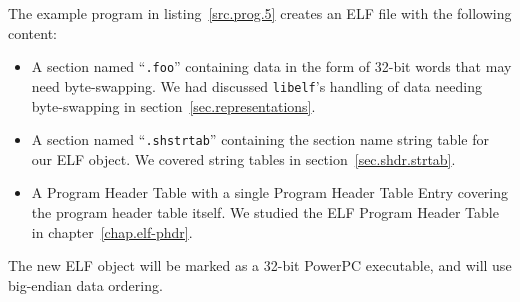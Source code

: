 \documentclass[a4paper,pdftex]{book}
\newcommand{\code}[1]{\texttt{#1}}
\newcommand{\library}[1]{\texttt{#1}}
\newcommand{\trade}{{\small\texttrademark}\xspace}
\newcommand{\elfdatastructure}[1]{\textsf{#1}}
\begin{document}
The example program in listing~\vref{src.prog.5} creates an ELF file
with the following content:

\begin{itemize}
\item A section named ``\code{.foo}'' containing data in the form
  of 32-bit words that may need byte-swapping. We had discussed
  \library{libelf}'s handling of data needing byte-swapping in
  section~\vref{sec.representations}.
\item A section named ``\code{.shstrtab}'' containing the section
  name string table for our ELF object. We covered string tables
  in section~\vref{sec.shdr.strtab}.
\item A \elfdatastructure{Program Header Table} with a single
  \elfdatastructure{Program Header Table Entry} covering the program
  header table itself. We studied the ELF \elfdatastructure{Program
    Header Table} in chapter~\ref{chap.elf-phdr}.
\end{itemize}

The new ELF object will be marked as a 32-bit PowerPC\trade
executable, and will use big-endian data ordering.
\end{document}
